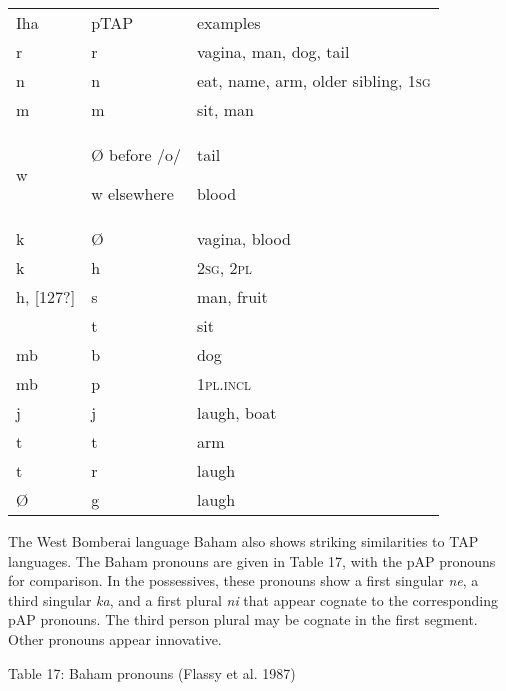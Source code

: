 \begin{center}
\tablehead{}
\begin{supertabular}{m{0.32055986in}m{0.8997598in}m{2.31016in}}
Iha &
pTAP &
examples\\
r &
r &
vagina, man, dog, tail\\
n &
n &
eat, name, arm, older sibling, \textsc{1sg}\\
m &
m &
sit, man\\
w &
{\O} before /o/

w elsewhere &
tail 

blood\\
k &
{\O} &
vagina, blood\\
k &
h &
\textsc{2sg, 2pl}\\
h, [127?] &
s &
man, fruit\footnotemark{}\\
[127?] &
t &
sit\\
mb &
b &
dog\\
mb &
p &
\textsc{1pl.incl}\\
j &
j &
laugh, boat\footnotemark{}\\
t &
t &
arm\\
t &
r &
laugh\\
{\O} &
g &
laugh\\
\end{supertabular}
\end{center}
\addtocounter{footnote}{-2}
The West Bomberai language Baham also shows striking similarities to TAP languages. The Baham pronouns are given in Table 17, with the pAP pronouns for comparison. In the possessives, these pronouns show a first singular \textit{ne}, a third singular \textit{ka}, and a first plural \textit{ni} that appear cognate to the corresponding pAP pronouns. The third person plural may be cognate in the first segment. Other pronouns appear innovative. 

{\centering
Table 17: Baham pronouns (Flassy et al. 1987)
\par}

